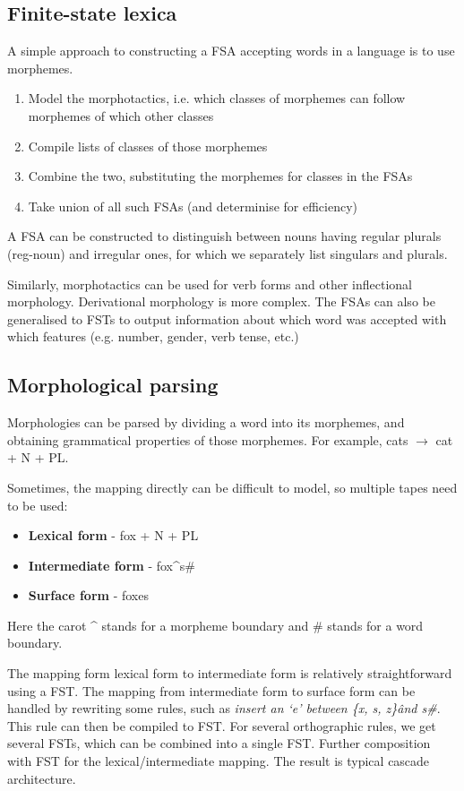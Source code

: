 \documentclass[Report.tex]{subfiles}
\begin{document}
\subsection{Finite-state lexica}
A simple approach to constructing a FSA accepting words in a
language is to use morphemes.
\begin{enumerate}
\item Model the morphotactics, i.e. which classes of morphemes
  can follow morphemes of which other classes
\item Compile lists of classes of those morphemes
\item Combine the two, substituting the morphemes for classes
  in the FSAs
\item Take union of all such FSAs (and determinise for efficiency)
\end{enumerate}
A FSA can be constructed to distinguish between nouns having regular
plurals (reg-noun) and irregular ones, for which we separately
list singulars and plurals.


Similarly, morphotactics can be used for verb forms and other inflectional
morphology. Derivational morphology is more complex. The FSAs can also be
generalised to FSTs to output information about which word was accepted
with which features (e.g. number, gender, verb tense, etc.)

\subsection{Morphological parsing}
Morphologies can be parsed by dividing a word into its morphemes, and
obtaining grammatical properties of those morphemes. For example,
cats $\rightarrow$ cat + N + PL.

Sometimes, the mapping directly can be difficult to model,
so multiple tapes need to be used:
\begin{itemize}
\item \textbf{Lexical form} - fox + N + PL
\item \textbf{Intermediate form} - fox\^{}s\#
\item \textbf{Surface form} - foxes
\end{itemize}
Here the carot \^{} stands for a morpheme boundary and \# stands
for a word boundary.

The mapping form lexical form to intermediate form is relatively
straightforward using a FST. The mapping from intermediate form
to surface form can be handled by rewriting some rules, such as
\textit{insert an `e' between \{x, s, z\}\^ and s\#}. This rule
can then be compiled to FST. For several orthographic rules,
we get several FSTs, which can be combined into a single FST.
Further composition with FST for the lexical/intermediate mapping.
The result is typical cascade architecture.
\end{document}
